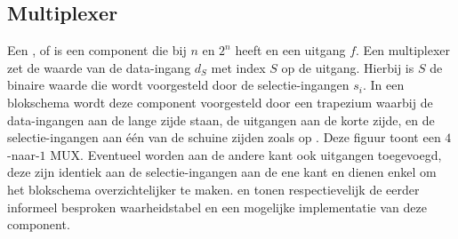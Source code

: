 \subsection{Multiplexer}
Een ,  of  is een component die bij $n$  en $2^n$  heeft en een uitgang $f$. Een multiplexer zet de waarde van de data-ingang $d_S$ met index $S$ op de uitgang. Hierbij is $S$ de binaire waarde die wordt voorgesteld door de selectie-ingangen $s_i$. In een blokschema wordt deze component voorgesteld door een trapezium waarbij de data-ingangen aan de lange zijde staan, de uitgangen aan de korte zijde, en de selectie-ingangen aan \'e\'en van de schuine zijden zoals op . Deze figuur toont een $4$-naar-$1$ MUX. Eventueel worden aan de andere kant ook uitgangen toegevoegd, deze zijn identiek aan de selectie-ingangen aan de ene kant en dienen enkel om het blokschema overzichtelijker te maken.  en  tonen respectievelijk de eerder informeel besproken waarheidstabel en een mogelijke implementatie van deze component.


